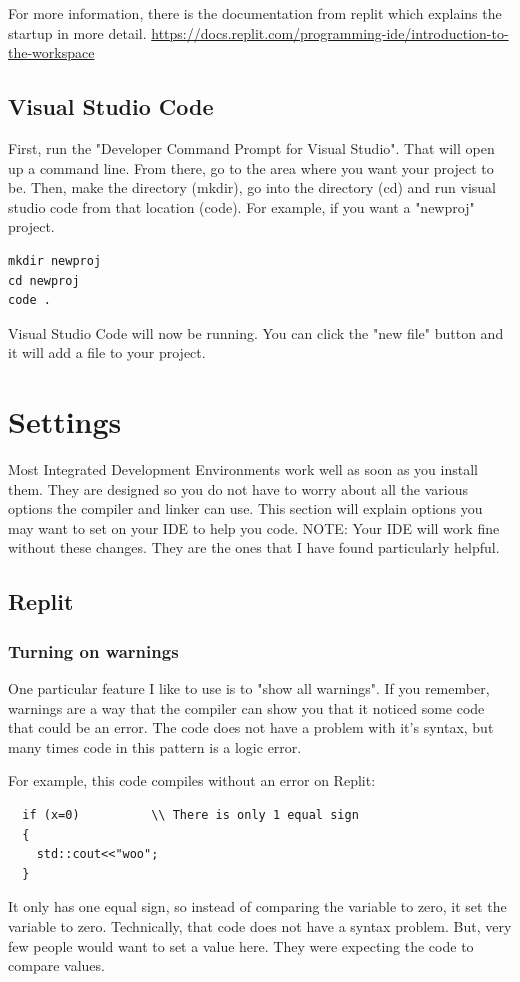 For more information, there is the documentation from replit which explains the startup in more detail. 
\url{https://docs.replit.com/programming-ide/introduction-to-the-workspace}
\subsection{Visual Studio Code}
First, run the "Developer Command Prompt for Visual Studio". That will open up a command line. From there, go to the area where you want your project to be. Then, make the directory (mkdir), go into the directory (cd) and run visual studio code from that location (code). For example, if you want a "newproj" project.

\begin{verbatim}
mkdir newproj
cd newproj
code .    
\end{verbatim}

Visual Studio Code will now be running. You can click the "new file" button and it will add a file to your project.

\section{Settings}
Most Integrated Development Environments work well as soon as you install them. They are designed so you do not have to worry about all the various options the compiler and linker can use. This section will explain options you may want to set on your IDE to help you code. NOTE: Your IDE will work fine without these changes. They are the ones that I have found particularly helpful.
\subsection{Replit}
\subsubsection{Turning on warnings}
\label{showwarning}
One particular feature I like to use is to "show all warnings". If you remember, warnings are a way that the compiler can show you that it noticed some code that could be an error. The code does not have a problem with it's syntax, but many times code in this pattern is a logic error.

For example, this code compiles without an error on Replit:
\begin{lstlisting}
  if (x=0)          \\ There is only 1 equal sign
  {
    std::cout<<"woo";
  }
\end{lstlisting}
It only has one equal sign, so instead of comparing the variable
to zero, it set the variable to zero. Technically, that code does not have a syntax problem. But, very few people would want to set a value here. They were expecting the code to compare values.

